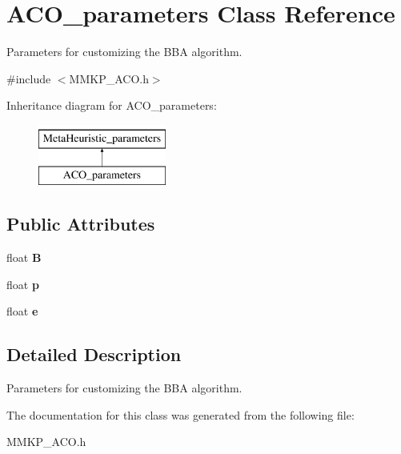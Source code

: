 \hypertarget{class_a_c_o__parameters}{\section{A\+C\+O\+\_\+parameters Class Reference}
\label{class_a_c_o__parameters}
}


Parameters for customizing the B\+B\+A algorithm.  




{\ttfamily \#include $<$M\+M\+K\+P\+\_\+\+A\+C\+O.\+h$>$}

Inheritance diagram for A\+C\+O\+\_\+parameters\+:\begin{figure}[H]
\begin{center}
\leavevmode
\includegraphics[height=2.000000cm]{class_a_c_o__parameters}
\end{center}
\end{figure}
\subsection*{Public Attributes}
\begin{DoxyCompactItemize}
\item 
\hypertarget{class_a_c_o__parameters_a8f79d15269b376621cddc45459249f66}{float {\bfseries B}}\label{class_a_c_o__parameters_a8f79d15269b376621cddc45459249f66}

\item 
\hypertarget{class_a_c_o__parameters_ad24b910f7578ae8c869b2e9c2e9cf0c7}{float {\bfseries p}}\label{class_a_c_o__parameters_ad24b910f7578ae8c869b2e9c2e9cf0c7}

\item 
\hypertarget{class_a_c_o__parameters_a441c9c99641ba9284457b5a8c04af4d5}{float {\bfseries e}}\label{class_a_c_o__parameters_a441c9c99641ba9284457b5a8c04af4d5}

\end{DoxyCompactItemize}


\subsection{Detailed Description}
Parameters for customizing the B\+B\+A algorithm. 

The documentation for this class was generated from the following file\+:\begin{DoxyCompactItemize}
\item 
M\+M\+K\+P\+\_\+\+A\+C\+O.\+h\end{DoxyCompactItemize}
